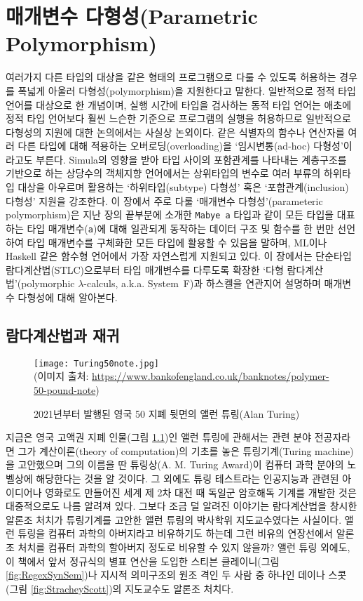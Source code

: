 \chapter{매개변수 다형성(Parametric Polymorphism)}\label{chap:ParaPoly}
여러가지 다른 타입의 대상을 같은 형태의 프로그램으로 다룰 수 있도록
허용하는 경우를 폭넓게 아울러 다형성(polymorphism)을 지원한다고 말한다.
일반적으로 정적 타입 언어를 대상으로 한 개념이며, 실행 시간에 타입을
검사하는 동적 타입 언어는 애초에 정적 타입 언어보다 훨씬 느슨한 기준으로
프로그램의 실행을 허용하므로 일반적으로 다형성의 지원에 대한 논의에서는
사실상 논외이다. 같은 식별자의 함수나 연산자를 여러 다른 타입에 대해
적용하는 오버로딩(overloading)을 `임시변통(ad-hoc) 다형성'이라고도 부른다.
Simula의 영향을 받아 타입 사이의 포함관계를 나타내는 계층구조를 기반으로
하는 상당수의 객체지향 언어에서는 상위타입의 변수로 여러 부류의
하위타입 대상을 아우르며 활용하는 `하위타입(subtype) 다형성' 혹은
`포함관계(inclusion) 다형성' 지원을 강조한다. 이 장에서 주로 다룰
`매개변수 다형성'(parameteric polymorphism)은 지난 장의 끝부분에
소개한 \texttt{Mabye a} 타입과 같이 모든 타입을 대표하는
타입 매개변수(\texttt{a})에 대해 일관되게 동작하는 데이터 구조 및 함수를
한 번만 선언하여 타입 매개변수를 구체화한 모든 타입에 활용할 수 있음을 말하며,
ML이나 Haskell 같은 함수형 언어에서 가장 자연스럽게 지원되고 있다.
이 장에서는 단순타입 람다계산법(STLC)으로부터 타입 매개변수를 다루도록
확장한 `다형 람다계산법'(polymorphic $\lambda$-calculs, a.k.a. System~F)과
하스켈을 연관지어 설명하며 매개변수 다형성에 대해 알아본다.

\section{람다계산법과 재귀}\label{sec:lambdaRec}
\begin{figure}[b]\centering
\texttt{[image: Turing50note.jpg]}\\
{\footnotesize(이미지 출처:
 \url{https://www.bankofengland.co.uk/banknotes/polymer-50-pound-note})}
\caption{2021년부터 발행된 영국 50\textsterling{} 지폐 뒷면의
	앨런 튜링(Alan Turing)\label{fig:Turing50note} }
\end{figure}
지금은 영국 고액권 지폐 인물(그림 \ref{fig:Turing50note})인 앨런 튜링에
관해서는 관련 분야 전공자라면 그가 계산이론(theory of computation)의
기초를 놓은 튜링기계(Turing machine)을 고안했으며 그의 이름을 딴
튜링상(A. M. Turing Award)이 컴퓨터 과학 분야의 노벨상에 해당한다는 것을
알 것이다. 그 외에도 튜링 테스트라는 인공지능과 관련된 아이디어나
영화로도 만들어진 세계 제 2차 대전 때 독일군 암호해독 기계를 개발한 것은
대중적으로도 나름 알려져 있다. 그보다 조금 덜 알려진 이야기는 람다계산법을
창시한 알론조 처치가 튜링기계를 고안한 앨런 튜링의 박사학위 지도교수였다는
사실이다. 앨런 튜링을 컴퓨터 과학의 아버지라고 비유하기도 하는데 그런 비유의
연장선에서 알론조 처치를 컴퓨터 과학의 할아버지 정도로 비유할 수 있지 않을까?
앨런 튜링 외에도, 이 책에서 앞서 정규식의 별표 연산을 도입한
스티븐 클레이니(그림 \ref{fig:RegexSynSem})나 지시적 의미구조의 원조 격인
두 사람 중 하나인 데이나 스콧(그림 \ref{fig:StracheyScott})의 지도교수도
알론조 처치다.

